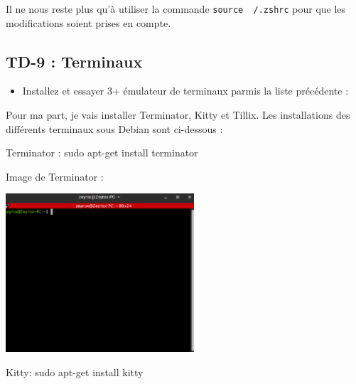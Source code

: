 \documentclass[12pt]{article}
\begin{document}
Il ne nous reste plus qu'à utiliser la commande \texttt{source ~/.zshrc} pour que les modifications soient prises en compte.

\newpage

  \subsection{TD-9 : Terminaux}

\vspace{0.3cm}

\begin{itemize}
  \item Installez et essayer 3+ émulateur de terminaux parmis la liste précédente : 
\end{itemize}

\vspace{0.3cm}

Pour ma part, je vais installer Terminator, Kitty et Tillix. Les installations des différents terminaux sous Debian sont ci-dessous :

\vspace{0.3cm}

Terminator : sudo apt-get install terminator

\vspace{0.3cm}

Image de Terminator : 

\vspace{0.3cm}

\begin{center}
  \includegraphics[width=7cm]{Images-TD-Env-Efficiency/Image-TD-9/terminator.png}
\end{center}

\vspace{0.3cm}

Kitty: sudo apt-get install kitty

\vspace{0.3cm}
\end{document}
